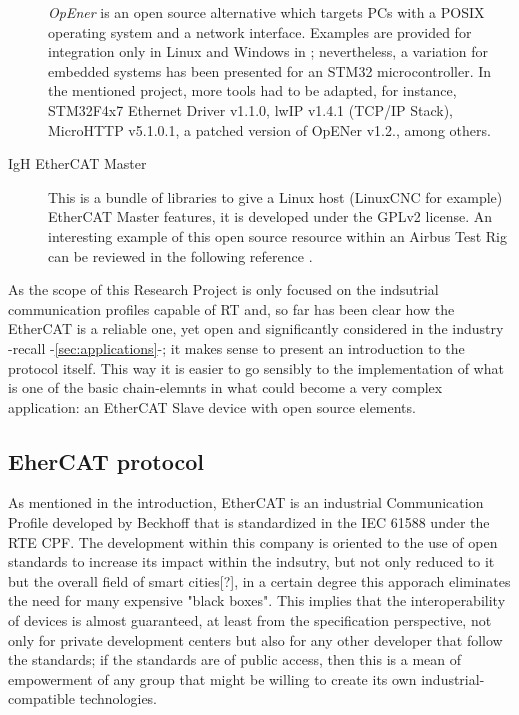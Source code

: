 \begin{description}
    \emph{OpEner} is an open source alternative which targets PCs with a POSIX operating system and a network interface. 
    Examples are provided for integration only in Linux and Windows in \cite{opener_stack}; %
    nevertheless, a variation for embedded systems has been presented for an STM32 microcontroller. In the mentioned project, more tools had to be adapted, for instance,
    STM32F4x7 Ethernet Driver v1.1.0, lwIP v1.4.1 (TCP/IP Stack), MicroHTTP v5.1.0.1, a patched version of OpENer v1.2., among others.\cite{opener_stm32}%
    \item[IgH EtherCAT Master] This is a bundle of libraries to give a Linux host (LinuxCNC for example) EtherCAT Master features, it is developed under the GPLv2 license. 
    An interesting example of this open source resource within an Airbus Test Rig can be reviewed in the following reference \cite{ecatstack_igh}. %
\end{description}

As the scope of this Research Project is only focused on the indsutrial communication profiles capable of RT and, so far has been clear how 
the EtherCAT is a reliable one, yet open and significantly considered in the industry -recall -\ref{sec:applications}-; it makes sense to present an introduction to the protocol itself. 
This way it is easier to go sensibly to the implementation of what is one of the basic chain-elemnts in what could become a very complex application: 
an EtherCAT Slave device with open source elements.

\subsection{EherCAT protocol}\label{sec:ecat_protocol}

As mentioned in the introduction, EtherCAT is an industrial Communication Profile developed by Beckhoff that is 
standardized in the IEC 61588 under the RTE CPF. The development within this company is oriented to the use of 
open standards to increase its impact within the indsutry, but not only reduced to it but the overall field of smart cities[?], in
a certain degree this apporach eliminates the need for many expensive "black boxes"\cite{beckhoff_automation}. %
This implies that the interoperability of devices is almost guaranteed, at least from the specification perspective,
not only for private development centers but also for any other developer that follow the standards; if the standards 
are of public access, then this is a mean of empowerment of any group that might be willing
to create its own industrial-compatible technologies.

